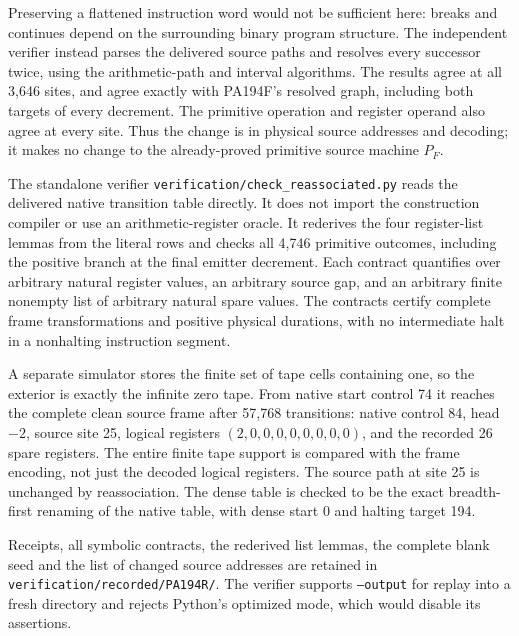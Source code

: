 Preserving a flattened instruction word would not be sufficient here:
breaks and continues depend on the surrounding binary program structure.
The independent verifier instead parses the delivered source paths and
resolves every successor twice, using the arithmetic-path and interval
algorithms. The results agree at all 3,646 sites, and agree exactly with
PA194F's resolved graph, including both targets of every decrement.
The primitive operation and register operand also agree at every site.
Thus the change is in physical source addresses and decoding; it makes
no change to the already-proved primitive source machine $P_F$.

The standalone verifier
\texttt{verification/check\_reassociated.py} reads the delivered native
transition table directly. It does not import the construction compiler
or use an arithmetic-register oracle. It rederives the four register-list
lemmas from the literal rows and checks all 4,746 primitive outcomes,
including the positive branch at the final emitter decrement. Each
contract quantifies over arbitrary natural register values, an arbitrary
source gap, and an arbitrary finite nonempty list of arbitrary natural
spare values. The contracts certify complete frame transformations and
positive physical durations, with no intermediate halt in a nonhalting
instruction segment.

A separate simulator stores the finite set of tape cells containing one,
so the exterior is exactly the infinite zero tape. From native start
control 74 it reaches the complete clean source frame after 57,768
transitions: native control 84, head $-2$, source site 25, logical
registers $(2,0,0,0,0,0,0,0,0)$, and the recorded 26 spare registers.
The entire finite tape support is compared with the frame encoding,
not just the decoded logical registers. The source path at site 25 is
unchanged by reassociation. The dense table is checked to be the exact
breadth-first renaming of the native table, with dense start 0 and
halting target 194.

Receipts, all symbolic contracts, the rederived list lemmas, the complete
blank seed and the list of changed source addresses are retained in
\texttt{verification/recorded/PA194R/}. The verifier supports
\texttt{--output} for replay into a fresh directory and rejects Python's
optimized mode, which would disable its assertions.

